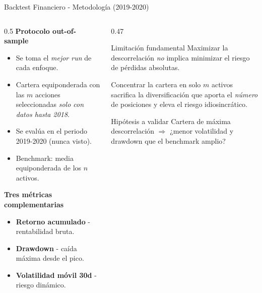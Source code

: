 \documentclass[aspectratio=169]{beamer}
\begin{document}
\begin{frame}{Backtest Financiero - Metodología (2019-2020)}
  \begin{columns}[T]
    \begin{column}{0.5\textwidth}
      \textbf{Protocolo out-of-sample}
      \begin{itemize}
        \item Se toma el \emph{mejor run} de cada enfoque.
        \item Cartera equiponderada con las $m$ acciones
              seleccionadas \emph{solo con datos hasta 2018}.
        \item Se evalúa en el periodo 2019-2020 (nunca visto).
        \item Benchmark: media equiponderada de los $n$ activos.
      \end{itemize}

      \vspace{8pt}
      \textbf{Tres métricas complementarias}
      \begin{itemize}
        \item \textbf{Retorno acumulado} - rentabilidad bruta.
        \item \textbf{Drawdown} - caída máxima desde el pico.
        \item \textbf{Volatilidad móvil 30d} - riesgo dinámico.
      \end{itemize}
    \end{column}
    \begin{column}{0.47\textwidth}
      \begin{alertblock}{Limitación fundamental}
        Maximizar la descorrelación \emph{no} implica minimizar
        el riesgo de pérdidas absolutas.

        \vspace{4pt}
        Concentrar la cartera en solo $m$ activos sacrifica la
        diversificación que aporta el \emph{número} de posiciones
        y eleva el riesgo idiosincrático.
      \end{alertblock}

      \vspace{6pt}
      \begin{block}{Hipótesis a validar}
        Cartera de máxima descorrelación $\Rightarrow$ ¿menor
        volatilidad y drawdown que el benchmark amplio?
      \end{block}
    \end{column}
  \end{columns}
\end{frame}
\end{document}
